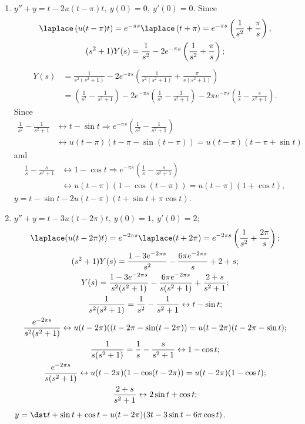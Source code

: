 \documentclass[openany]{book}
\newenvironment{sectionSolutions}{
 \begin{enumerate}[item-label={\thesection.\arabic{enumi}.}]
}{
 \end{enumerate}
}
\begin{document}
\begin{sectionSolutions}
\item
 $y''+y=t-2u(t-\pi)t,\ y(0)=0,\ y'(0)=0$.
Since
\begin{gather*}
\laplace \left(u(t-\pi)t\right)=e^{-\pi s}\laplace \left(t+\pi\right)
=e^{-\pi s}\left(\frac{1}{ s^2}+\frac{\pi}{ s}\right),
\\
(s^2+1)Y(s)=\frac{1}{ s^2}-2e^{-\pi s}\left(\frac{1}{ s^2}+\frac{\pi}{
s}\right);
\end{gather*}
\begin{align*}
Y(s)&= \frac{1}{ s^2(s^2+1)}-2e^{-\pi s}\left(\frac{1}{
s^2(s^2+1)}+\frac{\pi}{ s(s^2+1)}\right)\\
&=\left(\frac{1}{ s^2}-\frac{1}{
s^2+1}\right)-2e^{-\pi s} \left(\frac{1}{ s^2}-\frac{1}{
s^2+1}\right)-2\pi e^{-\pi s}\left(\frac{1}{ s}-\frac{s}{
s^2+1}\right).
\end{align*}
Since
\begin{align*}
\frac{1}{ s^2}-\frac{1}{ s^2+1}&\leftrightarrow t-\sin t\Rightarrow
e^{-\pi s}\left(\frac{1}{ s^2}-\frac{1}{ s^2+1}\right)\\
&\leftrightarrow
u(t-\pi)\left(t-\pi-\sin(t-\pi)\right)=u(t-\pi)(t-\pi+\sin t)
\end{align*}
and
\begin{align*}
\frac{1}{ s}-\frac{s}{ s^2+1}&\leftrightarrow 1-\cos t\Rightarrow
e^{-\pi s}\left(\frac{1}{ s}-\frac{s}{ s^2+1}\right)\\
&\leftrightarrow u(t-\pi)\left(1-\cos(t-\pi)\right)=u(t-\pi)(1+\cos t),
\end{align*}
 $y=t-\sin t-2u(t-\pi)(t+\sin t+\pi\cos t)$.


\item
$y''+y=t-3u(t-2\pi)t,\ y(0)=1,\ y'(0)=2;$
\begin{gather*}
\laplace (u(t-2\pi)t)=e^{-2\pi s}\laplace (t+2\pi)=e^{-2\pi s}
\left(\frac{1}{ s^2}+\frac{2\pi}{ s}\right);
\\
(s^2+1)Y(s)=\frac{1-3e^{-2\pi s}}{ s^2}-\frac{6\pi e^{-2\pi s}}{ s}+2+s;
\\
Y(s)=\frac{1-3e^{-2\pi s}}{ s^2(s^2+1)}-\frac{6\pi e^{-2\pi s}}{ s(s^2+1)}
+\frac{2+s}{ s^2+1};
\\
\frac{1}{ s^2(s^2+1)}=\frac{1}{ s^2}-\frac{1}{ s^2+1}\leftrightarrow
t-\sin t;
\\
\frac{e^{-2\pi s}}{ s^2(s^2+1)}\leftrightarrow
u(t-2\pi)((t-2\pi-\sin(t-2\pi))=u(t-2\pi)(t-2\pi-\sin t);
\\
\frac{1}{ s(s^2+1)}=\frac{1}{ s}-\frac{s}{ s^2+1}\leftrightarrow
1-\cos t;
\\
\frac{e^{-2\pi s}}{ s(s^2+1)}\leftrightarrow u(t-2\pi)
(1-\cos(t-2\pi))=u(t-2\pi)(1-\cos t);
\\
\frac{2+s}{ s^2+1}\leftrightarrow 2\sin t+\cos t;
\end{gather*}
$y=\dst t+\sin t+\cos t-u(t-2\pi)(3t-3\sin t-6\pi\cos t)$.



\end{sectionSolutions}
\end{document}
